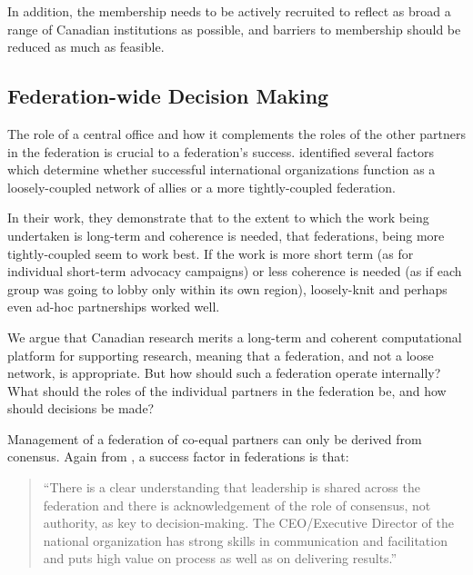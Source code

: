 \documentclass[11pt, letterpaper, twoside]{article}
\begin{document}
In addition, the membership needs to be actively recruited to reflect as
broad a range of Canadian institutions as possible, and barriers to
membership should be reduced as much as feasible.

\subsection*{Federation-wide Decision Making}
%

The role of a central office and how it complements the roles of the
other partners in the federation is crucial to a federation's success.
\cite{Brown20121098} identified several factors which
determine whether successful international organizations function as a
loosely-coupled network of allies or a more tightly-coupled federation.

In their work, they demonstrate that to the extent to which the work
being undertaken is long-term and coherence is needed, that federations,
being more tightly-coupled seem to work best. If the work is more short
term (as for individual short-term advocacy campaigns) or less coherence
is needed (as if each group was going to lobby only within its own
region), loosely-knit and perhaps even ad-hoc partnerships worked well.

We argue that Canadian research merits a long-term and coherent
computational platform for supporting research, meaning that a
federation, and not a loose network, is appropriate. But how should such
a federation operate internally? What should the roles of the individual
partners in the federation be, and how should decisions be made?

Management of a federation of co-equal partners can only be derived from
conensus.  Again from \cite{mollenhauer_framework}, a success factor in
federations is that:

\begin{quote}
``There is a clear understanding that leadership is shared across the
federation and there is acknowledgement of the role of consensus, not
authority, as key to decision-making. The CEO/Executive Director of
the national organization has strong skills in communication and
facilitation and puts high value on process as well as on delivering
results.''
\end{quote}

\end{document}
